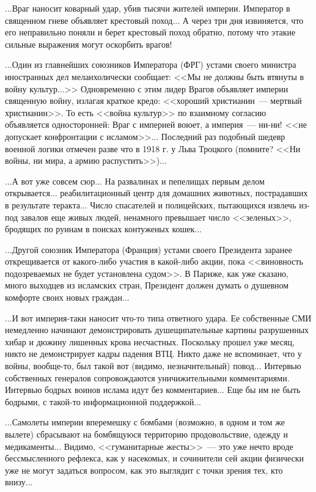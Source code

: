 \documentclass{scrbook}
\newcommand{\flqq}{<<}
\newcommand{\frqq}{>>}
\newcommand{\mdash}{~--- }
\begin{document}
...Враг наносит коварный удар, убив тысячи жителей империи. Император в священном гневе объявляет крестовый поход... А через три дня извиняется, что его неправильно поняли и берет крестовый поход обратно, потому что этакие сильные выражения могут оскорбить врагов!

...Один из главнейших союзников Императора (ФРГ) устами своего министра иностранных дел меланхолически сообщает: {\flqq}Мы не должны быть втянуты в войну культур...{\frqq} Одновременно с этим лидер Врагов объявляет империи священную войну, излагая краткое кредо: {\flqq}хороший христианин{\mdash}мертвый христианин{\frqq}. То есть {\flqq}война культур{\frqq} по взаимному согласию объявляется односторонней: Враг с империей воюет, а империя{\mdash}ни-ни! {\flqq}не допускает конфронтации с исламом{\frqq}... Последний раз подобный шедевр военной логики отмечен разве что в 1918 г. у Льва Троцкого (помните? {\flqq}Ни войны, ни мира, а армию распустить{\frqq})...

...А вот уже совсем сюр... На развалинах и пепелищах первым делом открывается... реабилитационный центр для домашних животных, пострадавших в результате теракта... Число спасателей и полицейских, пытающихся извлечь из-под завалов еще живых людей, ненамного превышает число {\flqq}зеленых{\frqq}, бродящих по руинам в поисках контуженых кошек...

...Другой союзник Императора (Франция) устами своего Президента заранее открещивается от какого-либо участия в какой-либо акции, пока {\flqq}виновность подозреваемых не будет установлена судом{\frqq}. В Париже, как уже сказано, много выходцев из исламских стран, Президент должен думать о душевном комфорте своих новых граждан...

...И вот империя-таки наносит что-то типа ответного удара. Ее собственные СМИ немедленно начинают демонстрировать душещипательные картины разрушенных хибар и дюжину лишенных крова несчастных. Поскольку прошел уже месяц, никто не демонстрирует кадры падения ВТЦ. Никто даже не вспоминает, что у войны, вообще-то, был такой вот (видимо, незначительный) повод... Интервью собственных генералов сопровождаются уничижительными комментариями. Интервью бодрых воинов ислама идут без комментариев... Еще бы им не быть бодрыми, с такой-то информационной поддержкой...

...Самолеты империи вперемешку с бомбами (возможно, в одном и том же вылете) сбрасывают на бомбящуюся территорию продовольствие, одежду и медикаменты... Видимо, {\flqq}гуманитарные жесты{\frqq}{\mdash}это уже нечто вроде бессмысленного рефлекса, как у насекомых, и сочинители сей акции физически уже не могут задаться вопросом, как это выглядит с точки зрения тех, кто внизу...
\end{document}
